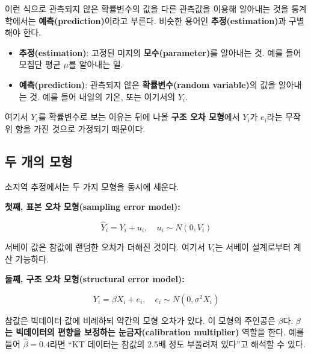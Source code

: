 \documentclass[
  letterpaper,
  DIV=11,
  numbers=noendperiod]{scrreprt}
\providecommand{\tightlist}{%
  \setlength{\itemsep}{0pt}\setlength{\parskip}{0pt}}
\begin{document}
\begin{tcolorbox}[enhanced jigsaw, arc=.35mm, bottomrule=.15mm, bottomtitle=1mm, breakable, colback=white, colbacktitle=quarto-callout-note-color!10!white, colframe=quarto-callout-note-color-frame, coltitle=black, left=2mm, leftrule=.75mm, opacityback=0, opacitybacktitle=0.6, rightrule=.15mm, title=\textcolor{quarto-callout-note-color}{\faInfo}\hspace{0.5em}{예측(prediction)과 추정(estimation)의 구별}, titlerule=0mm, toprule=.15mm, toptitle=1mm]

이런 식으로 관측되지 않은 확률변수의 값을 다른 관측값을 이용해 알아내는
것을 통계학에서는 \textbf{예측(prediction)}이라고 부른다. 비슷한 용어인
\textbf{추정(estimation)}과 구별해야 한다.

\begin{itemize}
\tightlist
\item
  \textbf{추정(estimation)}: 고정된 미지의 \textbf{모수(parameter)}를
  알아내는 것. 예를 들어 모집단 평균 \(\mu\)를 알아내는 일.
\item
  \textbf{예측(prediction)}: 관측되지 않은 \textbf{확률변수(random
  variable)}의 값을 알아내는 것. 예를 들어 내일의 기온, 또는 여기서의
  \(Y_i\).
\end{itemize}

여기서 \(Y_i\)를 확률변수로 보는 이유는 뒤에 나올 \textbf{구조 오차
모형}에서 \(Y_i\)가 \(e_i\)라는 무작위 항을 가진 것으로 가정되기
때문이다.

\end{tcolorbox}

\subsection{두 개의 모형}\label{uxb450-uxac1cuxc758-uxbaa8uxd615}

소지역 추정에서는 두 가지 모형을 동시에 세운다.

\textbf{첫째, 표본 오차 모형(sampling error model):}

\[\hat{Y}_i = Y_i + u_i, \quad u_i \sim N(0, V_i)\]

서베이 값은 참값에 랜덤한 오차가 더해진 것이다. 여기서 \(V_i\)는 서베이
설계로부터 계산 가능하다.

\textbf{둘째, 구조 오차 모형(structural error model):}

\[Y_i = \beta X_i + e_i, \quad e_i \sim N(0, \sigma^2 X_i)\]

참값은 빅데이터 값에 비례하되 약간의 모형 오차가 있다. 이 모형의
주인공은 \(\beta\)다. \textbf{\(\beta\)는 빅데이터의 편향을 보정하는
눈금자(calibration multiplier)} 역할을 한다. 예를 들어
\(\hat{\beta} = 0.4\)라면 ``KT 데이터는 참값의 2.5배 정도 부풀려져
있다''고 해석할 수 있다.
\end{document}
